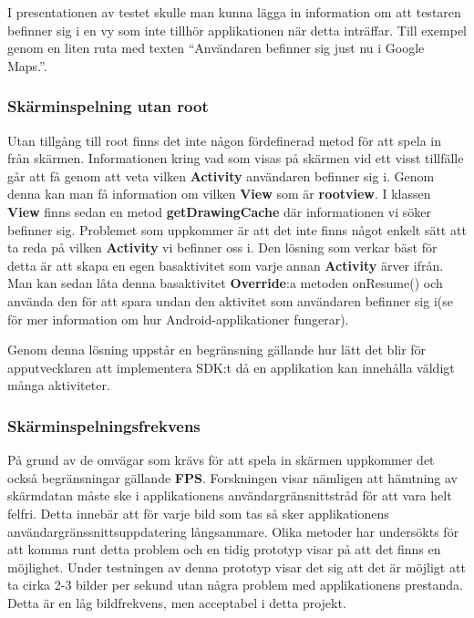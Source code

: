 I presentationen av testet skulle man kunna lägga in information om att testaren befinner sig i en vy som inte tillhör applikationen när detta inträffar. Till exempel genom en liten ruta med texten ``Användaren befinner sig just nu i Google Maps.''.

\subsubsection{Skärminspelning utan root}
\label{screenrecordingwithoutroot}
Utan tillgång till root finns det inte någon fördefinerad metod för att spela in från skärmen. Informationen kring vad som visas på skärmen vid ett visst tillfälle går att få genom att veta vilken \textbf{Activity} användaren befinner sig i. Genom denna kan man få information om vilken \textbf{View} som är \textbf{rootview}. I klassen \textbf{View} finns sedan en metod \textbf{getDrawingCache} där informationen vi söker befinner sig. Problemet som uppkommer är att det inte finns något enkelt sätt att ta reda på vilken \textbf{Activity} vi befinner oss i. Den lösning som verkar bäst för detta är att skapa en egen basaktivitet som varje annan \textbf{Activity} ärver ifrån. Man kan sedan låta denna basaktivitet \textbf{Override}:a metoden onResume() och använda den för att spara undan den aktivitet som användaren befinner sig i(se \parencite{androidfundamentals} för mer information om hur Android-applikationer fungerar).

Genom denna lösning uppstår en begränsning gällande hur lätt det blir för apputvecklaren att implementera SDK:t då en applikation kan innehålla väldigt många aktiviteter. 

\subsubsection{Skärminspelningsfrekvens}
På grund av de omvägar som krävs för att spela in skärmen uppkommer det också begränsningar gällande \textbf{FPS}. Forskningen visar nämligen att hämtning av skärmdatan måste ske i applikationens användargränsnittstråd för att vara helt felfri. Detta innebär att för varje bild som tas så sker applikationens användargränssnittsuppdatering långsammare. Olika metoder har undersökts för att komma runt detta problem och en tidig prototyp visar på att det finns en möjlighet. Under testningen av denna prototyp visar det sig att det är möjligt att ta cirka 2-3 bilder per sekund utan några problem med applikationens prestanda. Detta är en låg bildfrekvens, men acceptabel i detta projekt.

